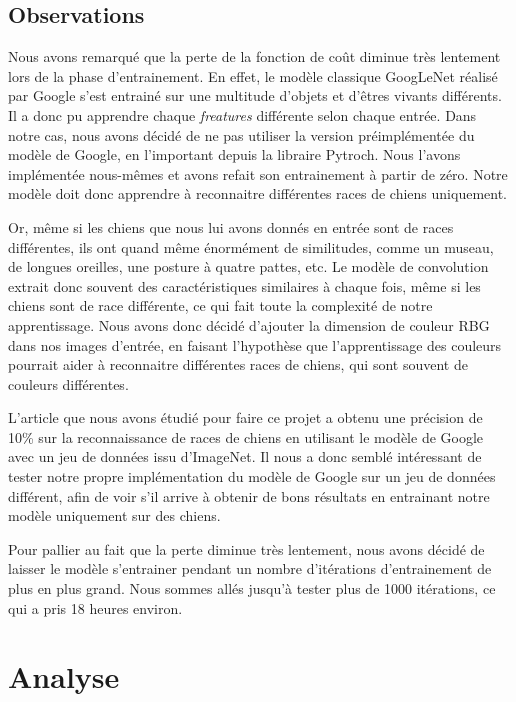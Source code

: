 \documentclass{article}
\begin{document}
\subsection{Observations}
Nous avons remarqué que la perte de la fonction de coût diminue très lentement
lors de la phase d’entrainement. En effet, le modèle classique GoogLeNet réalisé
par Google s’est entrainé sur une multitude d’objets et d'êtres vivants
différents. Il a donc pu apprendre chaque \textit{freatures} différente selon
chaque entrée. Dans notre cas, nous avons décidé de ne pas utiliser la version
préimplémentée du modèle de Google, en l'important depuis la libraire Pytroch.
Nous l'avons implémentée nous-mêmes et avons refait son entrainement à
partir de zéro. Notre modèle doit donc apprendre à reconnaitre différentes races
de chiens uniquement.

Or, même si les chiens que nous lui avons donnés en entrée sont de races
différentes, ils ont quand même énormément de similitudes, comme un museau, de
longues oreilles, une posture à quatre pattes, etc. Le modèle de convolution
extrait donc souvent des caractéristiques similaires à chaque fois, même si les
chiens sont de race différente, ce qui fait toute la complexité de notre
apprentissage. Nous avons donc décidé d’ajouter la dimension de couleur RBG dans
nos images d’entrée, en faisant l'hypothèse que l’apprentissage des couleurs
pourrait aider à reconnaitre différentes races de chiens, qui sont souvent de
couleurs différentes. 

L’article que nous avons étudié pour faire ce projet a obtenu une précision de 10\%
sur la reconnaissance de races de chiens en utilisant le modèle de Google avec un
jeu de données issu d'ImageNet. Il nous a donc semblé intéressant de tester notre
propre implémentation du modèle de Google sur un jeu de données différent, afin de
voir s'il arrive à obtenir de bons résultats en entrainant notre modèle uniquement
sur des chiens.

Pour pallier au fait que la perte diminue très lentement, nous avons décidé de
laisser le modèle s’entrainer pendant un nombre d’itérations d’entrainement de
plus en plus grand. Nous sommes allés jusqu’à tester plus de 1000 itérations, ce
qui a pris 18 heures environ.


\section{Analyse}
\end{document}
